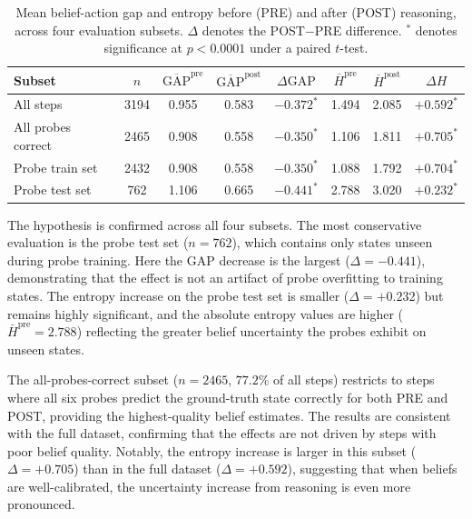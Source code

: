 \documentclass[final]{sparreport}
\begin{document}
\begin{table}[h]
\centering
\begin{tabular}{lccccccc}
\toprule
\textbf{Subset} & $n$ & $\overline{\text{GAP}}^{\text{pre}}$ & $\overline{\text{GAP}}^{\text{post}}$ & $\Delta\text{GAP}$ & $\overline{H}^{\text{pre}}$ & $\overline{H}^{\text{post}}$ & $\Delta H$ \\
\midrule
All steps              & 3194 & 0.955 & 0.583 & $-0.372^*$ & 1.494 & 2.085 & $+0.592^*$ \\
All probes correct     & 2465 & 0.908 & 0.558 & $-0.350^*$ & 1.106 & 1.811 & $+0.705^*$ \\
Probe train set        & 2432 & 0.908 & 0.558 & $-0.350^*$ & 1.088 & 1.792 & $+0.704^*$ \\
Probe test set         &  762 & 1.106 & 0.665 & $-0.441^*$ & 2.788 & 3.020 & $+0.232^*$ \\
\bottomrule
\end{tabular}
\caption{Mean belief-action gap and entropy before (PRE) and after (POST) 
reasoning, across four evaluation subsets. $\Delta$ denotes the POST$-$PRE 
difference. $^*$ denotes significance at $p < 0.0001$ under a paired $t$-test.}
\label{tab:gap_results}
\end{table}

The hypothesis is confirmed across all four subsets. The most conservative 
evaluation is the probe test set ($n=762$), which contains only states unseen 
during probe training. Here the GAP decrease is the largest ($\Delta = -0.441$), 
demonstrating that the effect is not an artifact of probe overfitting to training 
states. The entropy increase on the probe test set is smaller ($\Delta = +0.232$) 
but remains highly significant, and the absolute entropy values are higher 
($\bar{H}^{\text{pre}} = 2.788$) reflecting the greater belief uncertainty the 
probes exhibit on unseen states.

The all-probes-correct subset ($n=2465$, $77.2\%$ of all steps) restricts to 
steps where all six probes predict the ground-truth state correctly for both PRE 
and POST, providing the highest-quality belief estimates. The results are 
consistent with the full dataset, confirming that the effects are not driven by 
steps with poor belief quality. Notably, the entropy increase is larger in this 
subset ($\Delta = +0.705$) than in the full dataset ($\Delta = +0.592$), 
suggesting that when beliefs are well-calibrated, the uncertainty increase from 
reasoning is even more pronounced.
\end{document}
